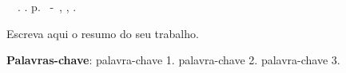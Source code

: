 \setlength{\absparsep}{18pt} %
\begin{resumo}
	\begin{flushleft} 
			\setlength{\absparsep}{0pt} %
			\SingleSpacing 
			\imprimirautorabr~~\textbf{\imprimirtituloresumo}.	\imprimirdata. \pageref{LastPage} p. 
			\imprimirtipotrabalho~-~\imprimirinstituicao, \imprimirlocal, \imprimirdata. 
 	\end{flushleft}
\OnehalfSpacing 			
Escreva aqui o resumo do seu trabalho.

 \textbf{Palavras-chave}: palavra-chave 1. palavra-chave 2. palavra-chave 3.
\end{resumo}
